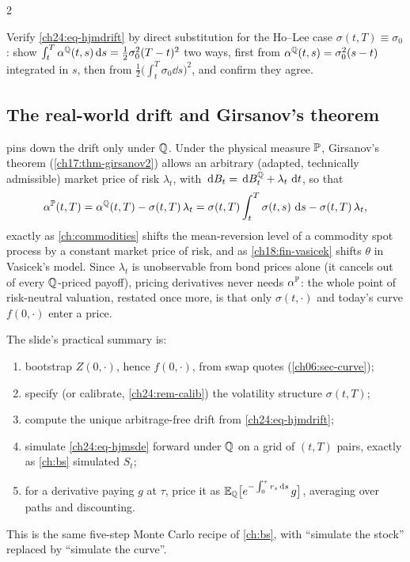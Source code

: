 \begin{paracol}{2}
\begin{exercise}\label{ch24:ex-driftcheck}
Verify \eqref{ch24:eq-hjmdrift} by direct substitution for the Ho--Lee case $\sigma(t,T)\equiv\sigma_0$: show $\int_t^T\alpha^{\mathbb{Q}}(t,s)\,\mathrm{d} s=\tfrac12\sigma_0^2(T-t)^2$ two ways, first from $\alpha^{\mathbb{Q}}(t,s)=\sigma_0^2(s-t)$ integrated in $s$, then from $\tfrac12\bigl(\int_t^T\sigma_0\dd s\bigr)^2$, and confirm they agree.
\end{exercise}

\subsection{The real-world drift and Girsanov's theorem}
 pins down the drift only under $\mathbb{Q}$. Under the physical measure $\mathbb{P}$, Girsanov's theorem (\cref{ch17:thm-girsanov2}) allows an arbitrary (adapted, technically admissible) market price of risk $\lambda_t$, with $\,\mathrm{d} B_t=\,\mathrm{d} B_t^{\mathbb{Q}}+\lambda_t\,\,\mathrm{d} t$, so that
\begin{equation}\label{ch24:eq-realdrift}
  \alpha^{\mathbb{P}}(t,T)=\alpha^{\mathbb{Q}}(t,T)-\sigma(t,T)\,\lambda_t=\sigma(t,T)\int_t^T\sigma(t,s)\,\,\mathrm{d} s-\sigma(t,T)\,\lambda_t ,
\end{equation}
exactly as \cref{ch:commodities} shifts the mean-reversion level of a commodity spot process by a constant market price of risk, and as \cref{ch18:fin-vasicek} shifts $\theta$ in Vasicek's model. Since $\lambda_t$ is unobservable from bond prices alone (it cancels out of every $\mathbb{Q}$-priced payoff), pricing derivatives never needs $\alpha^{\mathbb{P}}$: the whole point of risk-neutral valuation, restated once more, is that only $\sigma(t,\cdot)$ and today's curve $f(0,\cdot)$ enter a price.

\begin{finance}\label{ch24:fin-recipe}
The slide's practical summary  is:
\begin{enumerate}[1.]
  \item bootstrap $Z(0,\cdot)$, hence $f(0,\cdot)$, from swap quotes (\cref{ch06:sec-curve});
  \item specify (or calibrate, \cref{ch24:rem-calib}) the volatility structure $\sigma(t,T)$;
  \item compute the unique arbitrage-free drift from \eqref{ch24:eq-hjmdrift};
  \item simulate \eqref{ch24:eq-hjmsde} forward under $\mathbb{Q}$ on a grid of $(t,T)$ pairs, exactly as \cref{ch:bs} simulated $S_t$;
  \item for a derivative paying $g$ at $\tau$, price it as $\mathbb{E}_{\mathbb{Q}}\bigl[e^{-\int_0^\tau r_s\,\mathrm{d} s}\,g\bigr]$, averaging over paths and discounting.
\end{enumerate}
This is the same five-step Monte Carlo recipe of \cref{ch:bs}, with ``simulate the stock'' replaced by ``simulate the curve''.
\end{finance}


\end{paracol}
